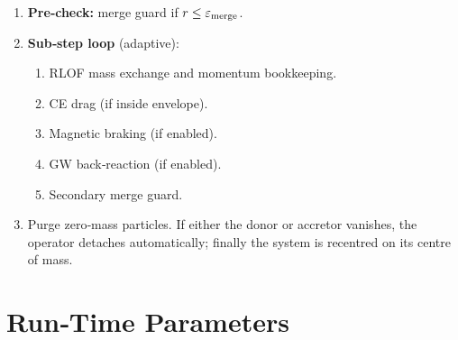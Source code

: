 \documentclass[11pt]{article}
\begin{document}
\begin{enumerate}[nosep]
\item \textbf{Pre‑check:} merge guard if $r\le\varepsilon_{\rm merge}$.
\item \textbf{Sub‑step loop} (adaptive):
  \begin{enumerate}[nosep]
    \item RLOF mass exchange and momentum bookkeeping.
    \item CE drag (if inside envelope).
    \item Magnetic braking (if enabled).
    \item GW back‑reaction (if enabled).
    \item Secondary merge guard.
  \end{enumerate}
\item Purge zero‑mass particles.  If either the donor or accretor vanishes,
      the operator detaches automatically; finally the system is recentred on
      its centre of mass.
\end{enumerate}

\section{Run‑Time Parameters}
\label{sec:param_table}
\end{document}
